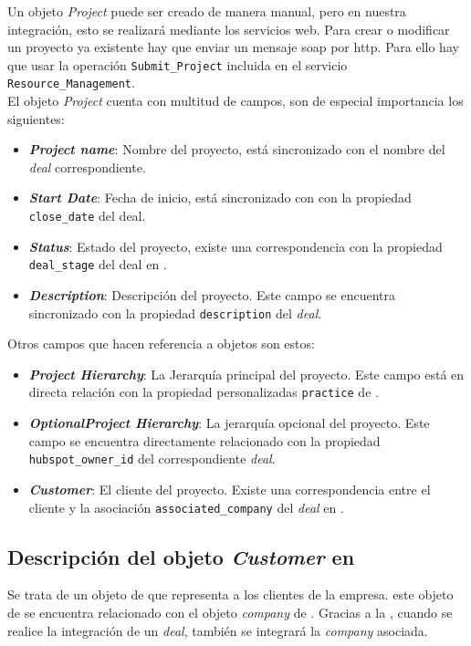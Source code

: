 Un objeto \textit{Project} puede ser creado de manera manual, pero en nuestra integración, esto se realizará mediante los servicios web.
Para crear o modificar un proyecto ya existente hay que enviar un mensaje \acrshort{soap} por \acrshort{http}. 
Para ello hay que usar la operación \texttt{Submit\_Project}  incluida en el servicio \texttt{Resource\_Management}.\\

El objeto \textit{Project} cuenta con multitud de campos, son de especial importancia los siguientes: 

\begin{itemize}
\item \textbf{\textit{Project name}}: Nombre del proyecto, está sincronizado con el nombre del \textit{deal} correspondiente.
\item \textbf{\textit{Start Date}}: Fecha de inicio, está sincronizado con con la propiedad \texttt{close\_date} del deal.
\item \textbf{\textit{Status}}: Estado del proyecto, existe una correspondencia con la propiedad \texttt{deal\_stage} del deal en \hs{}.
\item \textbf{\textit{Description}}: Descripción del proyecto. Este campo se encuentra sincronizado con la propiedad \texttt{description} del \textit{deal}.
\end{itemize}

Otros campos que hacen referencia a objetos son estos: 
\begin{itemize}
\item \textbf{\textit{Project Hierarchy}}: La Jerarquía principal del proyecto. Este campo está en directa relación con la propiedad personalizadas
\texttt{practice} de \hs.
\item \textbf{\textit{OptionalProject Hierarchy}}: La jerarquía opcional del proyecto. Este campo se encuentra directamente relacionado con la propiedad \texttt{hubspot\_owner\_id} del correspondiente \textit{deal}.
\item \textbf{\textit{Customer}}: El cliente del proyecto. Existe una correspondencia entre el cliente y la asociación \texttt{associated\_company} del \textit{deal} en \hs{}.

\end{itemize}



\subsection{Descripción del objeto \textit{Customer} en \wday{}}
Se trata de un objeto de \wday{} que representa a los clientes de la empresa. este objeto de \wday{} se encuentra relacionado con el objeto \textit{company} de \hs. 
Gracias a la \iface{}, cuando se realice la integración de un \textit{deal}, también se integrará la \textit{company} asociada.\\

